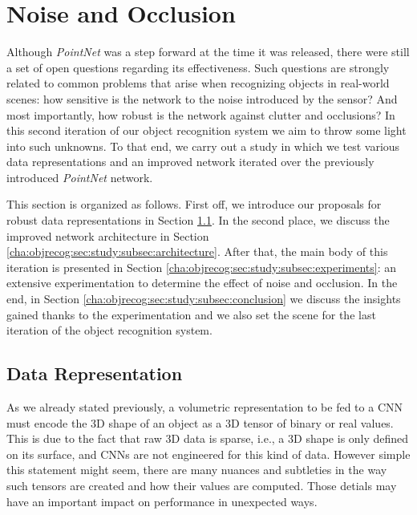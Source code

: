 \section{Noise and Occlusion}
\label{cha:objrecog:sec:study}

Although \emph{PointNet} was a step forward at the time it was released, there were still a set of open questions regarding its effectiveness. Such questions are strongly related to common problems that arise when recognizing objects in real-world scenes: how sensitive is the network to the noise introduced by the sensor? And most importantly, how robust is the network against clutter and occlusions? In this second iteration of our object recognition system we aim to throw some light into such unknowns. To that end, we carry out a study in which we test various data representations and an improved network iterated over the previously introduced \emph{PointNet} network.

This section is organized as follows. First off, we introduce our proposals for robust data representations in Section \ref{cha:objrecog:sec:study:subsec:representation}. In the second place, we discuss the improved network architecture in Section \ref{cha:objrecog:sec:study:subsec:architecture}. After that, the main body of this iteration is presented in Section \ref{cha:objrecog:sec:study:subsec:experiments}: an extensive experimentation to determine the effect of noise and occlusion. In the end, in Section \ref{cha:objrecog:sec:study:subsec:conclusion} we discuss the insights gained thanks to the experimentation and we also set the scene for the last iteration of the object recognition system.

\subsection{Data Representation}
\label{cha:objrecog:sec:study:subsec:representation}

As we already stated previously, a volumetric representation to be fed to a \acs{CNN} must encode the \acs{3D} shape of an object as a \acs{3D} tensor of binary or real values. This is due to the fact that raw \acs{3D} data is sparse, i.e., a \acs{3D} shape is only defined on its surface, and \acp{CNN} are not engineered for this kind of data. However simple this statement might seem, there are many nuances and subtleties in the way such tensors are created and how their values are computed. Those detials may have an important impact on performance in unexpected ways.

